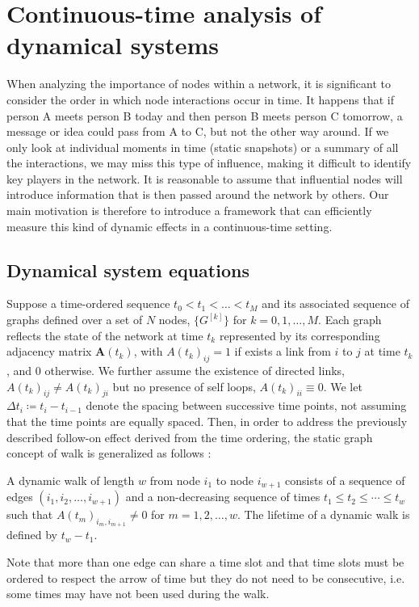 \chapter{Continuous-time analysis of dynamical systems}
\label{chap:cont}
When analyzing the importance of nodes within a network, it is significant to consider the order in which node interactions occur in time. It happens that if person A meets person B today and then person B meets person C tomorrow, a message or idea could pass from A to C, but not the other way around. If we only look at individual moments in time (static snapshots) or a summary of all the interactions, we may miss this type of influence, making it difficult to identify key players in the network. It is reasonable to assume that influential nodes will introduce information that is then passed around the network by others. Our main motivation is therefore to introduce a framework that can efficiently measure this kind of dynamic effects in a continuous-time setting.

\section{Dynamical system equations}
\label{sec:ode}
Suppose a time-ordered sequence $t_0 < t_1 < \dots < t_M $ and its associated sequence of graphs defined over a set of $N$ nodes, $\{G^{[k]}\}$ for $k = 0,1,\dots,M$. Each graph reflects the state of the network at time $t_k$ represented by its corresponding adjacency matrix $\mathbf{A}(t_k)$, with $A(t_k)_{ij} = 1$ if exists a link from $i$ to $j$ at time $t_k$, and $0$ otherwise. We further assume the existence of directed links, $A(t_k)_{ij} \ne A(t_k)_{ji}$ but no presence of self loops, $A(t_k)_{ii} \equiv 0$. We let $\Delta t_i \coloneqq t_i - t_{i-1}$ denote the spacing between successive time points, not assuming that the time points are equally spaced. Then, in order to address the previously described follow-on effect derived from the time ordering, the static graph concept of walk is generalized as follows \cite{grindrod2011communicability}:
\begin{definition}
    A dynamic walk of length $w$ from node $i_1$ to node $i_{w+1}$ consists of a sequence of edges $(i_1,i_2,\dots,i_{w+1})$ and a non-decreasing sequence of times $t_1\le t_2\le \cdots \le t_w$ such that $A(t_m)_{i_m,i_{m+1}}\ne 0$ for $m=1,2,\dots,w$. The lifetime of a dynamic walk is defined by $t_w - t_1$. 
\end{definition}
Note that more than one edge can share a time slot and that time slots must be ordered to respect the arrow of time but they do not need to be consecutive, i.e. some times may have not been used during the walk.

